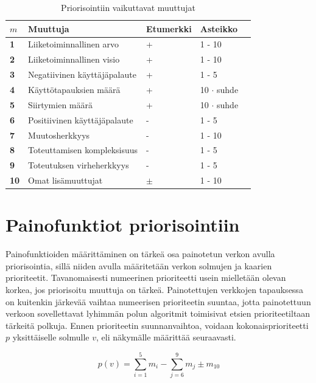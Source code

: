   \begin{table}[H]
    \caption{Priorisointiin vaikuttavat muuttujat}
    \label{tab:priorisointiin_vaikuttavat_muuttujat}
    \centering
    \begin{tabular}{lllll} \hline
    \(m\) & \textbf{Muuttuja} & \textbf{Etumerkki} & \textbf{Asteikko} &  \\ \hline
    \textbf{1} & Liiketoiminnallinen arvo & + & 1 - 10 &  \\
    \textbf{2} & Liiketoiminnallinen visio & + & 1 - 10 &  \\
    \textbf{3} & Negatiivinen käyttäjäpalaute & + & 1 - 5 &  \\
    \textbf{4} & Käyttötapauksien määrä & + & 10 \(\cdot\) suhde &  \\
    \textbf{5} & Siirtymien määrä & + & 10 \(\cdot\) suhde &  \\
    \textbf{6} & Positiivinen käyttäjäpalaute & - & 1 - 5 &  \\
    \textbf{7} & Muutosherkkyys & - & 1 - 10 &  \\
    \textbf{8} & Toteuttamisen kompleksisuus & - & 1 - 5 &  \\
    \textbf{9} & Toteutuksen virheherkkyys & - & 1 - 5 &  \\
    \textbf{10} & Omat lisämuuttujat & \(\pm\) & 1 - 10 & \\ \hline
    \end{tabular}
  \end{table}

\section{Painofunktiot priorisointiin} \label{ch:10_painofunktiot_priorisointiin}

  Painofunktioiden määrittäminen on tärkeä osa painotetun verkon avulla priorisointia, sillä niiden avulla määritetään verkon solmujen ja kaarien prioriteetit.
  Tavanomaisesti numeerinen prioriteetti usein mielletään olevan korkea, jos priorisoitu muuttuja on tärkeä.
  Painotettujen verkkojen tapauksessa on kuitenkin järkevää vaihtaa numeerisen prioriteetin suuntaa, jotta painotettuun verkoon sovellettavat lyhimmän polun algoritmit toimisivat etsien prioriteetiltaan tärkeitä polkuja. Ennen prioriteetin suunnanvaihtoa, voidaan kokonaisprioriteetti \(p\) yksittäiselle solmulle \(v\), eli näkymälle määrittää seuraavasti.

  \[p(v) = \sum_{i=1}^{5} m_i - \sum_{j=6}^{9} m_j \pm m_{10}\]

